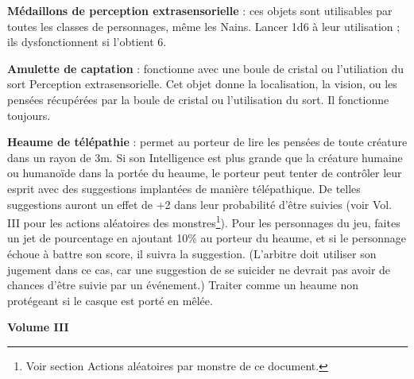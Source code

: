 \documentclass[11pt]{article}
\newcommand{\ODDtitlefont}{\fontsize{60}{40}\fontspec{Saloon Girl Inline}\selectfont}
\begin{document}
{{\bigskip

\textbf{Médaillons de perception extrasensorielle} : ces objets sont utilisables par toutes les classes de personnages, même les Nains. Lancer 1d6 à leur utilisation ; ils dysfonctionnent si l'obtient 6.

\bigskip

\textbf{Amulette de captation} : fonctionne avec une boule de cristal ou l'utiliation du sort Perception extrasensorielle. Cet objet donne la localisation, la vision, ou les pensées récupérées par la boule de cristal ou l'utilisation du sort. Il fonctionne toujours.

\bigskip

\label{heaume-telepathie}\textbf{Heaume de télépathie} : permet au porteur de lire les pensées de toute créature dans un rayon de 3m. Si son Intelligence est plus grande que la créature humaine ou humanoïde dans la portée du heaume, le porteur peut tenter de contrôler leur esprit avec des suggestions implantées de manière télépathique. De telles suggestions auront un effet de +2 dans leur probabilité d'être suivies (voir Vol. III pour les actions aléatoires des monstres\footnote{Voir section \og Actions aléatoires par monstre \fg{} de ce document.}). Pour les personnages du jeu, faites un jet de pourcentage en ajoutant 10\% au porteur du heaume, et si le personnage échoue à battre son score,%
il suivra la suggestion. (L'arbitre doit utiliser son jugement dans ce cas, car une suggestion de se suicider ne devrait pas avoir de chances d'être suivie par un événement.) Traiter comme un heaume non protégeant si le casque est porté en mêlée.

}%


\newpage
{}\begin{center}
{\Huge \ODDtitlefont{DONJONS \& DRAGONS}}{\normalsize \textsuperscript{\sffamily\textregistered}}

\vspace{1.8cm}

{\Large \textbf{Volume III}}


\end{center}}
\end{document}
